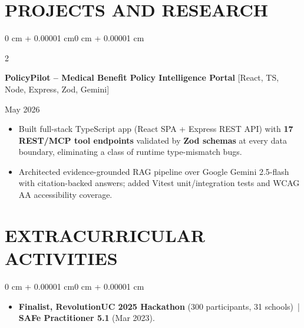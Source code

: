 \documentclass[10pt, letterpaper]{article}
\newenvironment{highlights}{
    \begin{itemize}[
        topsep=0.10 cm,
        parsep=0.06 cm,
        partopsep=0pt,
        itemsep=0.06 cm,
        leftmargin=12pt
    ]
}{
    \end{itemize}
}
\newenvironment{onecolentry}{
    \begin{adjustwidth}{0 cm + 0.00001 cm}{0 cm + 0.00001 cm}
}{
    \end{adjustwidth}
}
\newenvironment{twocolentry}[2][]{
    \onecolentry
    \def\secondColumn{#2}
    \setcolumnwidth{\fill, 4.5 cm}
    \begin{paracol}{2}
}{
    \switchcolumn \raggedleft \secondColumn
    \end{paracol}
    \endonecolentry
}
\begin{document}
\section{PROJECTS AND RESEARCH}
\begin{twocolentry}{May 2026}
\textbf{PolicyPilot -- Medical Benefit Policy Intelligence Portal} [React, TS, Node, Express, Zod, Gemini]
\end{twocolentry}
\begin{highlights}
  \item Built full-stack TypeScript app (React SPA + Express REST API) with \textbf{17 REST/MCP tool endpoints} validated by \textbf{Zod schemas} at every data boundary, eliminating a class of runtime type-mismatch bugs.
  \item Architected evidence-grounded RAG pipeline over Google Gemini 2.5-flash with citation-backed answers; added Vitest unit/integration tests and WCAG AA accessibility coverage.
\end{highlights}

\section{EXTRACURRICULAR ACTIVITIES}
\begin{onecolentry}
\begin{highlights}
  \item \textbf{Finalist, RevolutionUC 2025 Hackathon} (300 participants, 31 schools) \,|\, \textbf{SAFe Practitioner 5.1} (Mar 2023).
\end{highlights}
\end{onecolentry}
\end{document}
